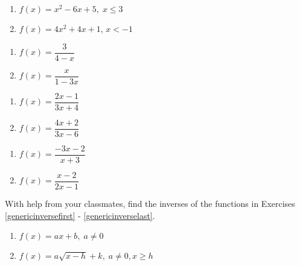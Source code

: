 \begin{multicols}{2}
\begin{enumerate}
\setcounter{enumi}{\value{HW}}

\item $f(x) = x^2-6x+5, \; x \leq 3$
\item $f(x) = 4x^2 + 4x + 1$, $x < -1$

\setcounter{HW}{\value{enumi}}
\end{enumerate}
\end{multicols}


\begin{multicols}{2}
\begin{enumerate}
\setcounter{enumi}{\value{HW}}

\item $f(x) = \dfrac{3}{4-x}$
\item $f(x) = \dfrac{x}{1-3x}$

\setcounter{HW}{\value{enumi}}
\end{enumerate}
\end{multicols}


\begin{multicols}{2}
\begin{enumerate}
\setcounter{enumi}{\value{HW}}

\item $f(x) = \dfrac{2x-1}{3x+4}$
\item $f(x) = \dfrac{4x + 2}{3x - 6}$

\setcounter{HW}{\value{enumi}}
\end{enumerate}
\end{multicols}


\begin{multicols}{2}
\begin{enumerate}
\setcounter{enumi}{\value{HW}}

\item $f(x) = \dfrac{-3x - 2}{x + 3}$ 

\item $f(x) = \dfrac{x-2}{2x-1}$  \label{inversehwlast}

\setcounter{HW}{\value{enumi}}
\end{enumerate}
\end{multicols}

With help from your classmates, find the inverses of the functions in Exercises \ref{genericinversefirst} - \ref{genericinverselast}.

\begin{multicols}{2}
\begin{enumerate}
\setcounter{enumi}{\value{HW}}

\item $f(x) = ax + b, \; a \neq 0$ \label{genericinversefirst}
\item $f(x) = a\sqrt{x - h} + k, \; a \neq 0, x \geq h$


\setcounter{HW}{\value{enumi}}
\end{enumerate}
\end{multicols}

